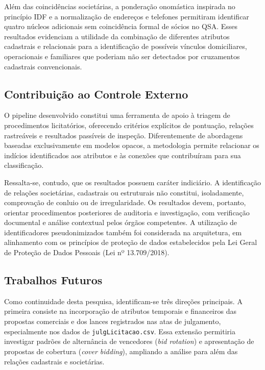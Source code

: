 Além das coincidências societárias, a ponderação onomástica inspirada no princípio IDF e a normalização de endereços e telefones permitiram identificar quatro núcleos adicionais sem coincidência formal de sócios no QSA. Esses resultados evidenciam a utilidade da combinação de diferentes atributos cadastrais e relacionais para a identificação de possíveis vínculos domiciliares, operacionais e familiares que poderiam não ser detectados por cruzamentos cadastrais convencionais.

\subsection{Contribuição ao Controle Externo}

O pipeline desenvolvido constitui uma ferramenta de apoio à triagem de procedimentos licitatórios, oferecendo critérios explícitos de pontuação, relações rastreáveis e resultados passíveis de inspeção. Diferentemente de abordagens baseadas exclusivamente em modelos opacos, a metodologia permite relacionar os indícios identificados aos atributos e às conexões que contribuíram para sua classificação.

Ressalta-se, contudo, que os resultados possuem caráter indiciário. A identificação de relações societárias, cadastrais ou estruturais não constitui, isoladamente, comprovação de conluio ou de irregularidade. Os resultados devem, portanto, orientar procedimentos posteriores de auditoria e investigação, com verificação documental e análise contextual pelos órgãos competentes. A utilização de identificadores pseudonimizados também foi considerada na arquitetura, em alinhamento com os princípios de proteção de dados estabelecidos pela Lei Geral de Proteção de Dados Pessoais (Lei nº 13.709/2018).

\subsection{Trabalhos Futuros}

Como continuidade desta pesquisa, identificam-se três direções principais. A primeira consiste na incorporação de atributos temporais e financeiros das propostas comerciais e dos lances registrados nas atas de julgamento, especialmente nos dados de \texttt{julgLicitacao.csv}. Essa extensão permitiria investigar padrões de alternância de vencedores (\textit{bid rotation}) e apresentação de propostas de cobertura (\textit{cover bidding}), ampliando a análise para além das relações cadastrais e societárias.

